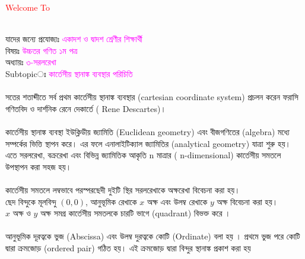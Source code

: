 \documentclass{article}
\begin{document}
 
	\Large
	\textcolor{red}{Welcome To} 
	\\
\\
যাদের জন্যে প্রযোজ্যঃ  	\textcolor{magenta}{একাদশ ও দ্বাদশ শ্রেণীর শিক্ষার্থী} \\
বিষয়ঃ \textcolor{magenta}{উচ্চতর গণিত ১ম পত্র} \\
অধ্যায়ঃ \textcolor{magenta}{৩-সরলরেখা}\\ 
Subtopicঃ  \textcolor{magenta}{ কার্তেসীয় স্থানাঙ্ক ব্যবস্থার পরিচিতি }\\
\\ 
সতের শতাব্দীতে সর্ব প্রথম কার্তেসীয় স্থানাঙ্ক ব্যবস্থার (cartesian coordinate system) প্রচলন করেন ফরাসি গণিতবিদ ও দার্শনিক রেনে দেকার্তে ( Rene Descartes)।\\
\\
 কার্তেসীয় স্থানাঙ্ক ব্যবস্থা ইউক্লিডীয় জ্যামিতি (Euclidean geometry) এবং বীজগণিতের (algebra) মধ্যে সম্পর্কের ভিত্তি স্থাপন করে। এর ফলে এনালাইটিক্যাল জ্যামিতির (analytical geometry) যাত্রা শুরু হয়।\\
  এতে সরলরেখা, বক্ররেখা এবং বিভিন্ন জ্যামিতিক আকৃতি n মাত্রার ( n-dimensional) কার্তেসীয় সমতলে উপস্থাপন করা সহজ হয়।\\
\\
 কার্তেসীয় সমতলে লম্বভাবে পরস্পরছেদী দুইটি স্থির সরলরেখাকে অক্ষরেখা বিবেচনা করা হয়।\\
  ছেদ বিন্দুকে মূলবিন্দু $(0,0)$, আনুভূমিক রেখাকে $x$ অক্ষ এবং উলম্ব রেখাকে $y$  অক্ষ বিবেচনা করা হয়।\\
  $x$ অক্ষ ও  $y$ অক্ষ সমগ্র কার্তেসীয় সমতলকে চারটি ভাগে (quadrant) বিভক্ত করে ।\\
  \\
   আনুভূমিক দূরত্বকে ভুজ (Abscissa) এবং উলম্ব দুরত্বকে কোটি (Ordinate) বলা হয় । প্রথমে ভুজ পরে কোটি দ্বারা ক্রমজোড় (ordered pair) গঠিত হয়। এই ক্রমজোড় দ্বারা বিন্দুর স্থানাঙ্ক প্রকাশ করা হয় \\
 \\
\end{document}
